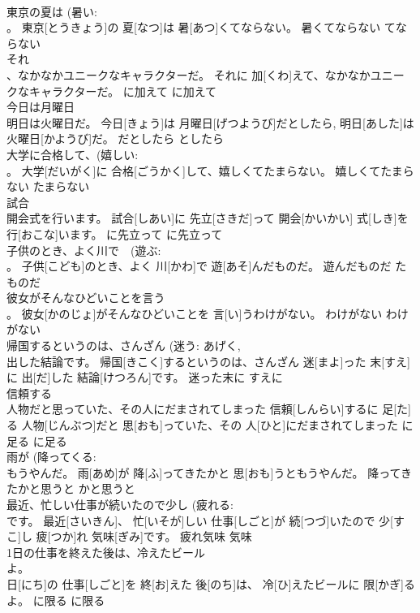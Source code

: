 \documentclass[8pt]{extreport}
\begin{document}
\begin{CJK}{UTF8}{min}
\\	東京の夏は (暑い: 
\\	。	東京[とうきょう]の 夏[なつ]は 暑[あつ]くてならない。	暑くてならない	てならない	
\\	それ 
\\	、なかなかユニークなキャラクターだ。	それに 加[くわ]えて、なかなかユニークなキャラクターだ。	に加えて	に加えて	
\\	今日は月曜日 
\\	明日は火曜日だ。	今日[きょう]は 月曜日[げつようび]だとしたら, 明日[あした]は 火曜日[かようび]だ。	だとしたら	としたら	
\\	大学に合格して、(嬉しい: 
\\	。	大学[だいがく]に 合格[ごうかく]して、嬉しくてたまらない。	嬉しくてたまらない	たまらない	
\\	試合 
\\	開会式を行います。	試合[しあい]に 先立[さきだ]って 開会[かいかい] 式[しき]を 行[おこな]います。	に先立って	に先立って	
\\	子供のとき、よく川で　(遊ぶ: 
\\	。	子供[こども]のとき、よく 川[かわ]で 遊[あそ]んだものだ。	遊んだものだ	たものだ	
\\	彼女がそんなひどいことを言う 
\\	。	彼女[かのじょ]がそんなひどいことを 言[い]うわけがない。	わけがない	わけがない	
\\	帰国するというのは、さんざん (迷う: あげく, 
\\	出した結論です。	帰国[きこく]するというのは、さんざん 迷[まよ]った 末[すえ]に 出[だ]した 結論[けつろん]です。	迷った末に	すえに	
\\	信頼する 
\\	人物だと思っていた、その人にだまされてしまった	信頼[しんらい]するに 足[た]る 人物[じんぶつ]だと 思[おも]っていた、その 人[ひと]にだまされてしまった	に足る	に足る	
\\	雨が (降ってくる: 
\\	もうやんだ。	雨[あめ]が 降[ふ]ってきたかと 思[おも]うともうやんだ。	降ってきたかと思うと	かと思うと~	
\\	最近、忙しい仕事が続いたので少し (疲れる: 
\\	です。	最近[さいきん]、 忙[いそが]しい 仕事[しごと]が 続[つづ]いたので 少[すこ]し 疲[つか]れ 気味[ぎみ]です。	疲れ気味	気味	
\\	1日の仕事を終えた後は、冷えたビール 
\\	よ。	
\\	日[にち]の 仕事[しごと]を 終[お]えた 後[のち]は、 冷[ひ]えたビールに 限[かぎ]るよ。	に限る	に限る	

\end{CJK}
\end{document}
